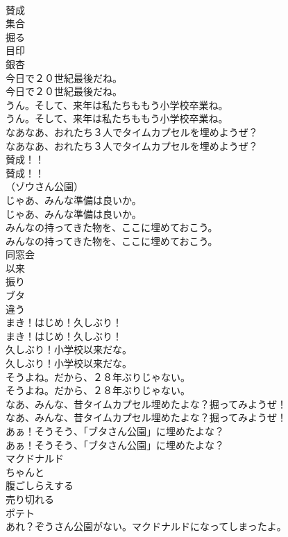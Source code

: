 \documentclass[8pt]{extreport}
\begin{document}
\begin{CJK}{UTF8}{min}
\\	賛成
\\	集合
\\	掘る
\\	目印
\\	銀杏
\\	今日で２０世紀最後だね。	
\\	今日で２０世紀最後だね。 
\\	うん。そして、来年は私たちももう小学校卒業ね。	
\\	うん。そして、来年は私たちももう小学校卒業ね。 
\\	なあなあ、おれたち３人でタイムカプセルを埋めようぜ？	
\\	なあなあ、おれたち３人でタイムカプセルを埋めようぜ？ 
\\	賛成！！	
\\	賛成！！ 
\\	（ゾウさん公園）	
\\	じゃあ、みんな準備は良いか。	
\\	じゃあ、みんな準備は良いか。 
\\	みんなの持ってきた物を、ここに埋めておこう。	
\\	みんなの持ってきた物を、ここに埋めておこう。 
\\	同窓会
\\	以来
\\	振り
\\	ブタ
\\	違う
\\	まき！はじめ！久しぶり！	
\\	まき！はじめ！久しぶり！ 
\\	久しぶり！小学校以来だな。	
\\	久しぶり！小学校以来だな。 
\\	そうよね。だから、２８年ぶりじゃない。	
\\	そうよね。だから、２８年ぶりじゃない。 
\\	なあ、みんな、昔タイムカプセル埋めたよな？掘ってみようぜ！	
\\	なあ、みんな、昔タイムカプセル埋めたよな？掘ってみようぜ！ 
\\	あぁ！そうそう、「ブタさん公園」に埋めたよな？	
\\	あぁ！そうそう、「ブタさん公園」に埋めたよな？ 
\\	マクドナルド
\\	ちゃんと
\\	腹ごしらえする
\\	売り切れる
\\	ポテト
\\	あれ？ぞうさん公園がない。マクドナルドになってしまったよ。	

\end{CJK}
\end{document}

